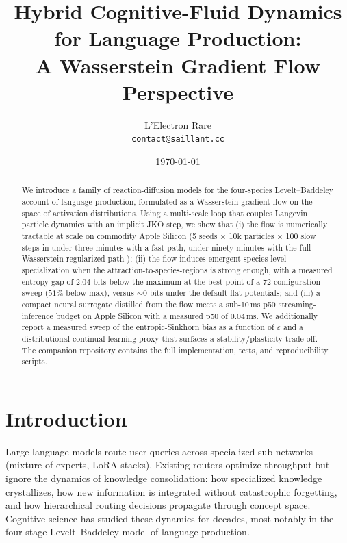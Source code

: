 \documentclass[11pt]{article}
\title{Hybrid Cognitive-Fluid Dynamics for Language Production: \\
       A Wasserstein Gradient Flow Perspective}
\author{L'Electron Rare \\ \texttt{contact@saillant.cc}}
\date{\today}
\begin{document}
\maketitle

\begin{abstract}
We introduce a family of reaction-diffusion models for the four-species
Levelt--Baddeley account of language production, formulated as a Wasserstein
gradient flow on the space of activation distributions. Using a multi-scale
loop that couples Langevin particle dynamics with an implicit JKO step,
we show that (i) the flow is numerically tractable at scale on commodity
Apple Silicon (5 seeds $\times$ 10k particles $\times$ 100 slow steps in
under three minutes with a fast path, under ninety minutes with the full
Wasserstein-regularized path%
); (ii) the flow induces emergent
species-level specialization when the attraction-to-species-regions is
strong enough, with a measured entropy gap of $2.04$ bits below the
maximum at the best point of a 72-configuration sweep ($51\%$ below max),
versus $\sim\!0$ bits under the default flat potentials; and (iii) a
compact neural surrogate distilled from the flow meets a sub-10\,ms p50
streaming-inference budget on Apple Silicon with a measured p50 of
$0.04$\,ms. We additionally report a measured sweep of the
entropic-Sinkhorn bias as a function of $\varepsilon$ and a distributional
continual-learning proxy that surfaces a stability/plasticity trade-off.
The companion repository contains the full implementation, tests, and
reproducibility scripts.
\end{abstract}

\section{Introduction}
\label{sec:intro}

Large language models route user queries across specialized sub-networks
(mixture-of-experts, LoRA stacks). Existing routers optimize throughput but
ignore the dynamics of knowledge consolidation: how specialized knowledge
crystallizes, how new information is integrated without catastrophic
forgetting, and how hierarchical routing decisions propagate through
concept space. Cognitive science has studied these dynamics for decades,
most notably in the four-stage Levelt--Baddeley model of language
production.
\end{document}
